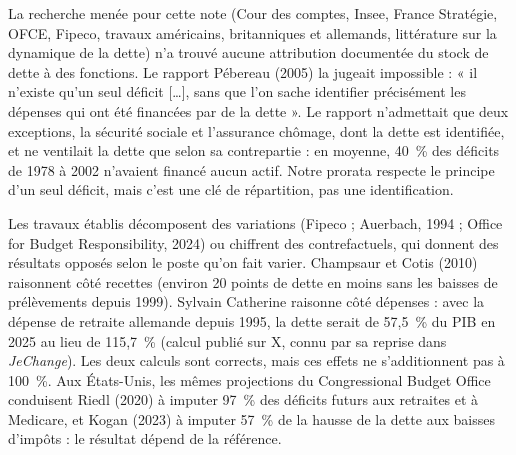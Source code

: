 \documentclass[11pt,a4paper]{article}
\begin{document}
La recherche menée pour cette note (Cour des comptes, Insee, France Stratégie, OFCE, Fipeco,
travaux américains, britanniques et allemands, littérature sur la dynamique de la dette) n'a trouvé
aucune attribution documentée du stock de dette à des fonctions. Le rapport Pébereau (2005) la
jugeait impossible : « il n'existe qu'un seul déficit […], sans que l'on sache identifier précisément
les dépenses qui ont été financées par de la dette ». Le rapport n'admettait que deux exceptions, la
sécurité sociale et l'assurance chômage, dont la dette est identifiée, et ne ventilait la dette que
selon sa contrepartie : en moyenne, 40~\% des déficits de 1978 à 2002 n'avaient financé aucun actif.
Notre prorata respecte le principe d'un seul déficit, mais c'est une clé de répartition, pas une
identification.

Les travaux établis décomposent des variations (Fipeco ; Auerbach, 1994 ; Office for Budget
Responsibility, 2024) ou chiffrent des contrefactuels, qui donnent des résultats opposés selon le
poste qu'on fait varier. Champsaur et Cotis (2010) raisonnent côté recettes (environ 20 points de
dette en moins sans les baisses de prélèvements depuis 1999). Sylvain Catherine raisonne côté
dépenses : avec la dépense de retraite allemande depuis 1995, la dette serait de 57,5~\% du PIB en
2025 au lieu de 115,7~\% (calcul publié sur X, connu par sa reprise dans \emph{JeChange}). Les deux
calculs sont corrects, mais ces effets ne s'additionnent pas à 100~\%. Aux États-Unis, les mêmes
projections du Congressional Budget Office conduisent Riedl (2020) à imputer 97~\% des déficits
futurs aux retraites et à Medicare, et Kogan (2023) à imputer 57~\% de la hausse de la dette aux
baisses d'impôts : le résultat dépend de la référence.
\end{document}
